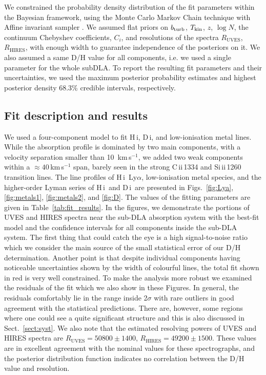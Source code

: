 \documentclass[fleqn,usenatbib]{mnras}
\newcommand{\DI}[0]{D\,{\sc i}}
\newcommand{\HI}[0]{H\,{\sc i}}
\newcommand{\CII}[0]{C\,{\sc ii}}
\newcommand{\SiII}[0]{Si\,{\sc ii}}
\begin{document}
We constrained the probability density distribution of the fit parameters within the Bayesian framework, using the Monte Carlo Markov Chain technique with Affine invariant sampler \citep{sampler}. We assumed flat priors on $b_{\rm turb}$, $T_{\rm kin}$, $z$, $\log N$, the continuum Chebyshev coefficients, $C_{i}$, and resolutions of the spectra $R_{\text{UVES}}$, $R_{\text{HIRES}}$, with enough width to guarantee independence of the posteriors on it. We also assumed a same D/H value for all components, i.e. we used a single parameter for the whole subDLA. To report the resulting fit parameters and their uncertainties, we used the maximum posterior probability estimates and highest posterior density 68.3\% credible intervals, respectively.

\subsection{Fit description and results}
\label{sect:fit}

We used a four-component model to fit \HI, \DI, and low-ionisation metal lines. While the absorption profile is dominated by two main components, with a velocity separation smaller than 10~km\,s$^{-1}$, we added two weak components within a $\approx 40$\,km\,s$^{-1}$ span, barely seen in the strong \CII\,1334 and \SiII\,1260 transition lines. The line profiles of \HI\ Ly$\alpha$, low-ionisation metal species, and the higher-order Lyman series of \HI\ and \DI\ are presented in Figs.~\ref{fig:Lya}, \ref{fig:metals1}, \ref{fig:metals2}, and \ref{fig:D}. The values of the fitting parameters are given in Table~\ref{tab:fit_results}. In the figures, we demonstrate the portions of UVES and HIRES spectra near the sub-DLA absorption system with the best-fit model and the confidence intervals for all components inside the sub-DLA system. The first thing that could catch the eye is a high signal-to-noise ratio which we consider the main source of the small statistical error of our D/H determination. Another point is that despite individual components having noticeable uncertainties shown by the width of colourful lines, the total fit shown in red is very well constrained. To make the analysis more robust we examined the residuals of the fit which we also show in these Figures. In general, the residuals comfortably lie in the range inside 2$\sigma$ with rare outliers in good agreement with the statistical predictions. There are, however, some regions where one could see a quite significant structure and this is also discussed in Sect.~\ref{sect:syst}. We also note that the estimated resolving powers of UVES and HIRES spectra are $R_{\text{UVES}}=50800\pm 1400$, $R_{\text{HIRES}}=49200\pm1500$. These values are in excellent agreement with the nominal values for these spectrographs, and the posterior distribution function indicates no correlation between the D/H value and resolution.
\end{document}
